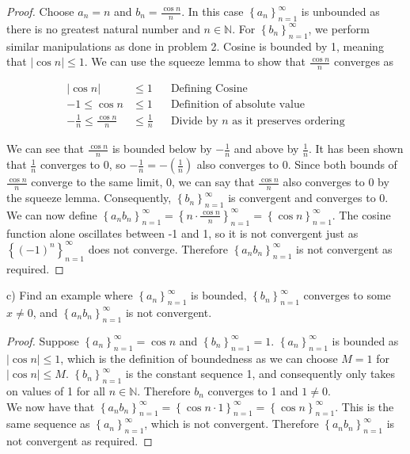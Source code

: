 \documentclass[12pt]{article}
\newcommand{\abs}[1]{\left| {#1} \right|}
\newcommand{\seq}[2][n]{\left\{ {#2} \right\}_{#1=1}^\infty}
\newcommand{\paren}[1]{\left( {#1} \right)}
\newcommand{\bN}{\mathbb{N}}
\begin{document}
\begin{proof}
	Choose $a_n=n$ and $b_n=\frac{\cos{n}}{n}$. In this case $\seq{a_n}$ is unbounded as there is no greatest natural number and $n\in\bN$. For $\seq{b_n}$, we perform similar manipulations as done in problem 2. Cosine is bounded by 1, meaning that $\abs{\cos{n}}\le1$. We can use the squeeze lemma to show that $\frac{\cos{n}}{n}$ converges as
	
\begin{align*}
	\abs{\cos{n}}&\le1 && \text{Defining Cosine} \\
	-1\le\cos{n}&\le1 && \text{Definition of absolute value} \\
	-\frac{1}{n}\le\frac{\cos{n}}{n}&\le\frac{1}{n	} && \text{Divide by }n\text{ as it preserves ordering}
\end{align*}

\noindent We can see that $\frac{\cos{n}}{n}$ is bounded below by $-\frac{1}{n}$ and above by $\frac{1}{n}$. It has been shown that $\frac{1}{n}$ converges to 0, so $-\frac{1}{n}=-\paren{\frac{1}{n}}$ also converges to 0. Since both bounds of $\frac{\cos{n}}{n}$ converge to the same limit, 0, we can say that $\frac{\cos{n}}{n}$ also converges to 0 by the squeeze lemma. Consequently, $\seq{b_n}$ is convergent and converges to 0. \\

\indent We can now define $\seq{a_nb_n}=\seq{n\cdot\frac{\cos{n}}{n}}=\seq{\cos{n}}$. The cosine function alone oscillates between -1 and 1, so it is not convergent just as $\seq{(-1)^n}$ does not converge. Therefore $\seq{a_nb_n}$ is not convergent as required.

\end{proof}

\newpage

\noindent c) Find an example where $\seq{a_n}$ is bounded, $\seq{b_n}$ converges to some $x\neq0$, and $\seq{a_nb_n}$ is not convergent.

\begin{proof}
	Suppose $\seq{a_n}=\cos{n}$ and $\seq{b_n}=1$. $\seq{a_n}$ is bounded as $\abs{\cos{n}}\le1$, which is the definition of boundedness as we can choose $M=1$ for $\abs{\cos{n}}\le M$. $\seq{b_n}$ is the constant sequence 1, and consequently only takes on values of 1 for all $n\in\bN$. Therefore $b_n$ converges to 1 and $1\neq0$. \\
	
\indent We now have that $\seq{a_nb_n}=\seq{\cos{n}\cdot1}=\seq{\cos{n}}$. This is the same sequence as $\seq{a_n}$, which is not convergent. Therefore $\seq{a_nb_n}$ is not convergent as required.
\end{proof}
\end{document}
